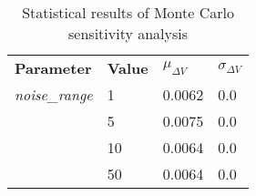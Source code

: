 
                    \begin{table}[]
                    \centering
                    \begin{tabular}{l l l l}
                    \rowcolor[HTML]{EFEFEF} \textbf{Parameter} & \textbf{Value} & \textbf{$\mu_{\Delta V}$} & \textbf{$\sigma_{\Delta V}$} \\
                    \textit{noise\_range} & 1 & 0.0062 & 0.0 \\
 & 5 & 0.0075 & 0.0 \\
 & 10 & 0.0064 & 0.0 \\
 & 50 & 0.0064 & 0.0 \\

                    \end{tabular}
                    \caption{Statistical results of Monte Carlo sensitivity analysis}
                    \label{tab:SensitivityAnalysis}
                    \end{table}
                    